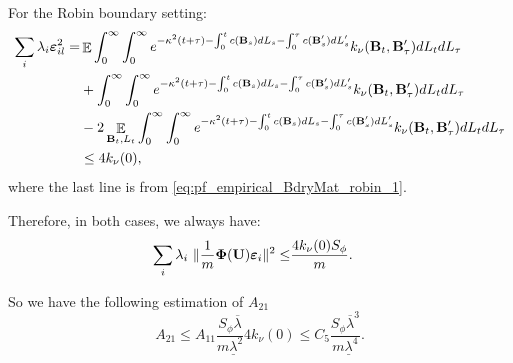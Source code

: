 \documentclass[aos,preprint]{imsart}
\theoremstyle{plain}
\DeclareMathOperator{\E}{\mathbb E}
\newcommand{\BB}{\bold B}
\newcommand{\BU}{\bold U}
\newcommand{\BPhi}{\boldsymbol{\Phi}}
\theoremstyle{remark}
\begin{document}
\begin{appendix}
For the Robin boundary setting:
\begin{align*}
   \sum_i\lambda_i \boldsymbol{\varepsilon}_{il}^2 = & \E \int_0^\infty \int_0^\infty e^{-\kappa^2(t+\tau)-\int_0^tc(\BB_s)dL_s-\int_0^\tau c(\BB'_s)dL'_s}k_\nu(\BB_t,\BB'_\tau)dL_tdL_\tau\\
   &+\int_0^\infty \int_0^\infty e^{-\kappa^2(t+\tau)-\int_0^tc(\BB_s)dL_s-\int_0^\tau c(\BB'_s)dL'_s}k_\nu(\BB_t,\BB'_\tau)dL_tdL_\tau\\
    &-2\E_{\BB_t,L_t}\int_0^\infty \int_0^\infty e^{-\kappa^2(t+\tau)-\int_0^tc(\BB_s)dL_s-\int_0^\tau c(\BB'_s)dL'_s}k_\nu(\BB_t,\BB'_\tau)dL_tdL_\tau\\
    &\leq 4k_\nu(0),
\end{align*}
where the last line is from \eqref{eq:pf_empirical_BdryMat_robin_1}.

Therefore, in both cases,  we always have:
\begin{align*}
     \sum_i\lambda_i\ \|\frac{1}{m}\BPhi(\BU)\boldsymbol{\varepsilon}_i\|^2
    \leq &\frac{4k_\nu(0)S_\phi}{m}.
\end{align*}


So we have the following estimation of $A_{21}$
\[A_{21}\leq A_{11}\frac{S_\phi\overline{\lambda}}{m\underline{\lambda}^2}4k_\nu(0)\leq C_5\frac{S_\phi\overline{\lambda}^3}{m\underline{\lambda}^4}.\]


\end{appendix}
\end{document}
